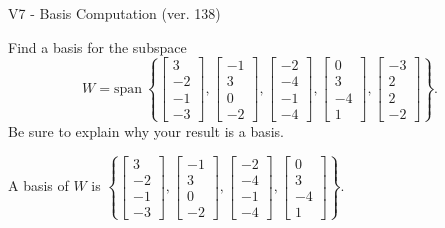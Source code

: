 \begin{exercise}
  \begin{exerciseTitle}V7 - Basis Computation (ver. 138)\end{exerciseTitle}
  \begin{exerciseStatement}
    Find a basis for the subspace 
\[W=\mathrm{span}\ \left\{\left[\begin{array}{r}
3 \\
-2 \\
-1 \\
-3
\end{array}\right] , \left[\begin{array}{r}
-1 \\
3 \\
0 \\
-2
\end{array}\right] , \left[\begin{array}{r}
-2 \\
-4 \\
-1 \\
-4
\end{array}\right] , \left[\begin{array}{r}
0 \\
3 \\
-4 \\
1
\end{array}\right] , \left[\begin{array}{r}
-3 \\
2 \\
2 \\
-2
\end{array}\right]\right\}.\]
 Be sure to explain why your result is a basis.


  \end{exerciseStatement}
  \begin{exerciseAnswer}
   A basis of \(W\) is  \(\left\{\left[\begin{array}{r}
3 \\
-2 \\
-1 \\
-3
\end{array}\right] , \left[\begin{array}{r}
-1 \\
3 \\
0 \\
-2
\end{array}\right] , \left[\begin{array}{r}
-2 \\
-4 \\
-1 \\
-4
\end{array}\right] , \left[\begin{array}{r}
0 \\
3 \\
-4 \\
1
\end{array}\right]\right\}\).
  


  \end{exerciseAnswer}
\end{exercise}